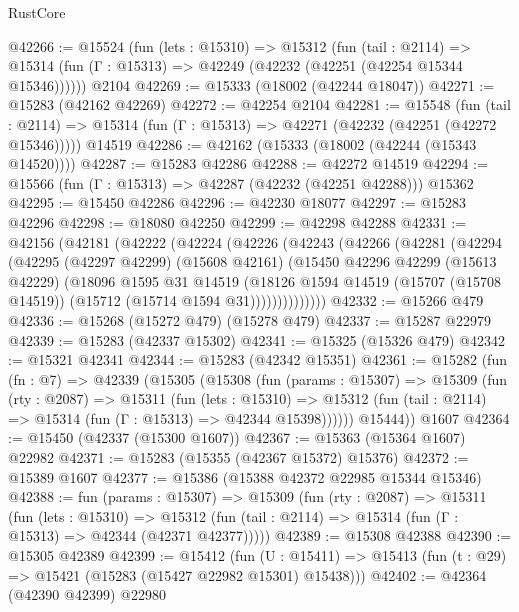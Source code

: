\begin{lexlean}{RustCore}
\begin{coremodule}
@42266 := @15524
    (fun (lets : @15310) =>
    @15312
      (fun (tail : @2114) =>
      @15314 (fun (Γ : @15313) => @42249 (@42232 (@42251 (@42254 @15344 @15346))))))
    @2104
@42269 := @15333 (@18002 (@42244 @18047))
@42271 := @15283 (@42162 @42269)
@42272 := @42254 @2104
@42281 := @15548
    (fun (tail : @2114) => @15314 (fun (Γ : @15313) => @42271 (@42232 (@42251 (@42272 @15346)))))
    @14519
@42286 := @42162 (@15333 (@18002 (@42244 (@15343 @14520))))
@42287 := @15283 @42286
@42288 := @42272 @14519
@42294 := @15566 (fun (Γ : @15313) => @42287 (@42232 (@42251 @42288))) @15362
@42295 := @15450 @42286
@42296 := @42230 @18077
@42297 := @15283 @42296
@42298 := @18080 @42250
@42299 := @42298 @42288
@42331 := @42156
    (@42181
      (@42222
        (@42224
          (@42226
            (@42243
              (@42266
                (@42281
                  (@42294
                    (@42295
                      (@42297 @42299)
                      (@15608 @42161)
                      (@15450
                        @42296
                        @42299
                        (@15613 @42229)
                        (@18096
                          @1595
                          @31
                          @14519
                          (@18126
                            @1594
                            @14519
                            (@15707 (@15708 @14519))
                            (@15712 (@15714 @1594 @31))))))))))))))
@42332 := @15266 @479
@42336 := @15268 (@15272 @479) (@15278 @479)
@42337 := @15287 @22979
@42339 := @15283 (@42337 @15302)
@42341 := @15325 (@15326 @479)
@42342 := @15321 @42341
@42344 := @15283 (@42342 @15351)
@42361 := @15282
    (fun (fn : @7) =>
    @42339
      (@15305
        (@15308
          (fun (params : @15307) =>
          @15309
            (fun (rty : @2087) =>
            @15311
              (fun (lets : @15310) =>
              @15312 (fun (tail : @2114) => @15314 (fun (Γ : @15313) => @42344 @15398))))))
        @15444))
    @1607
@42364 := @15450 (@42337 (@15300 @1607))
@42367 := @15363 (@15364 @1607) @22982
@42371 := @15283 (@15355 (@42367 @15372) @15376)
@42372 := @15389 @1607
@42377 := @15386 (@15388 @42372 @22985 @15344 @15346)
@42388 := fun (params : @15307) =>
  @15309
    (fun (rty : @2087) =>
    @15311
      (fun (lets : @15310) =>
      @15312 (fun (tail : @2114) => @15314 (fun (Γ : @15313) => @42344 (@42371 @42377)))))
@42389 := @15308 @42388
@42390 := @15305 @42389
@42399 := @15412
    (fun (U : @15411) => @15413 (fun (t : @29) => @15421 (@15283 (@15427 @22982 @15301) @15438)))
@42402 := @42364 (@42390 @42399) @22980

\end{coremodule}
\end{lexlean}
